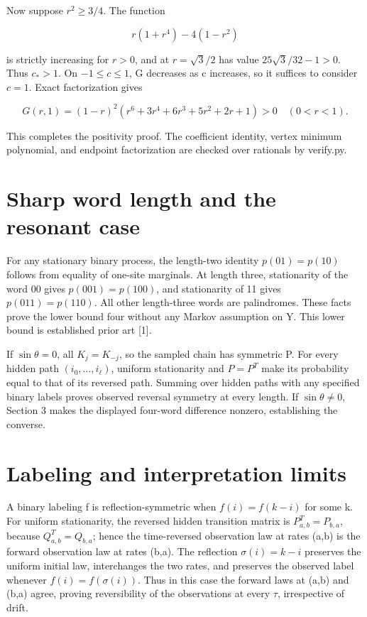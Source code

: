 \documentclass[11pt,a4paper]{article}
\begin{document}
Now suppose \(r^2\ge3/4\). The function

\[r(1+r^4)-4(1-r^2)\]

is strictly increasing for \(r>0\), and at \(r=\sqrt{3}/2\) has value
\(25\sqrt{3}/32-1>0\). Thus \(c_*>1\). On \(-1\le c\le1\), G decreases
as c increases, so it suffices to consider \(c=1\). Exact factorization
gives

\[G(r,1)=(1-r)^2
 (r^6+3r^4+6r^3+5r^2+2r+1)>0\quad(0<r<1).\]

This completes the positivity proof. The coefficient identity, vertex
minimum polynomial, and endpoint factorization are checked over
rationals by verify.py.

\hypertarget{sharp-word-length-and-the-resonant-case}{%
\section{Sharp word length and the resonant
case}\label{sharp-word-length-and-the-resonant-case}}

For any stationary binary process, the length-two identity
\(p(01)=p(10)\) follows from equality of one-site marginals. At length
three, stationarity of the word 00 gives \(p(001)=p(100)\), and
stationarity of 11 gives \(p(011)=p(110)\). All other length-three words
are palindromes. These facts prove the lower bound four without any
Markov assumption on Y. This lower bound is established prior art
{[}1{]}.

If \(\sin\theta=0\), all \(K_j=K_{-j}\), so the sampled chain has
symmetric P. For every hidden path \((i_0,\ldots,i_\ell)\), uniform
stationarity and \(P=P^T\) make its probability equal to that of its
reversed path. Summing over hidden paths with any specified binary
labels proves observed reversal symmetry at every length. If
\(\sin\theta\ne0\), Section 3 makes the displayed four-word difference
nonzero, establishing the converse.

\hypertarget{labeling-and-interpretation-limits}{%
\section{Labeling and interpretation
limits}\label{labeling-and-interpretation-limits}}

A binary labeling f is reflection-symmetric when \(f(i)=f(k-i)\) for
some k. For uniform stationarity, the reversed hidden transition matrix
is \(P_{a,b}^{T}=P_{b,a}\), because \(Q_{a,b}^{T}=Q_{b,a}\); hence the
time-reversed observation law at rates (a,b) is the forward observation
law at rates (b,a). The reflection \(\sigma(i)=k-i\) preserves the
uniform initial law, interchanges the two rates, and preserves the
observed label whenever \(f(i)=f(\sigma(i))\). Thus in this case the
forward laws at (a,b) and (b,a) agree, proving reversibility of the
observations at every \(\tau\), irrespective of drift.
\end{document}
